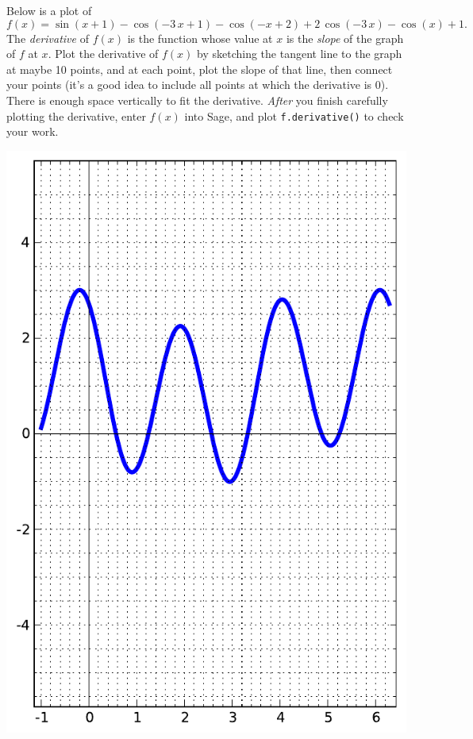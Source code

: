 Below is a plot of $$f(x)=\sin\left(x + 1\right) - \cos\left(-3 \, x + 1\right) - \cos\left(-x + 2\right) + 2 \, \cos\left(-3 \, x\right) - \cos\left(x\right) + 1.$$  The {\em \color{red}derivative} of $f(x)$ is the function whose value at $x$ is the {\em slope} of the graph of $f$ at $x$.  Plot the derivative of $f(x)$ by sketching the tangent line to the graph at maybe 10 points, and at each point, plot the slope of that line, then connect your points (it's a good idea to include all points at which the derivative is 0).  There is enough space vertically to fit the derivative.  {\em After} you finish carefully plotting the derivative, enter $f(x)$ into Sage, and plot {\color{blue}\verb|f.derivative()|} to check your work.
\begin{center}\includegraphics{functions/91.pdf}\end{center}\newpage

